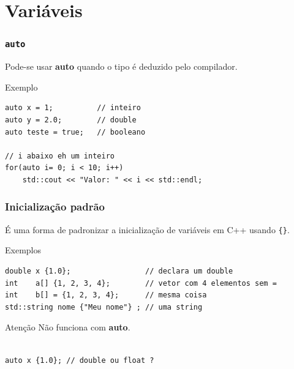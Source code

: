 \documentclass[xcolor={usenames,dvipsnames},10pt,compress,aspectratio=169]{beamer}
\begin{document}
\section{Variáveis}
\begin{frame}[fragile]
  \frametitle{\texttt{auto}}
Pode-se usar \textbf{auto} quando o tipo é deduzido pelo compilador.
  \begin{block}{Exemplo}
\begin{lstlisting}
auto x = 1;          // inteiro
auto y = 2.0;        // double
auto teste = true;   // booleano

// i abaixo eh um inteiro
for(auto i= 0; i < 10; i++)
    std::cout << "Valor: " << i << std::endl;
\end{lstlisting}
  \end{block}
\end{frame}
\begin{frame}[fragile]
  \frametitle{Inicialização padrão}
É uma forma de padronizar a inicialização de variáveis em C++ usando \verb+{}+.
  \begin{block}{Exemplos}
\begin{lstlisting}
double x {1.0};                 // declara um double
int    a[] {1, 2, 3, 4};        // vetor com 4 elementos sem = 
int    b[] = {1, 2, 3, 4};      // mesma coisa
std::string nome {"Meu nome"} ; // uma string
\end{lstlisting}
  \end{block}
\begin{alertblock}{Atenção}
Não funciona com \textbf{auto}.
\begin{lstlisting}

auto x {1.0}; // double ou float ?
\end{lstlisting}
\end{alertblock}
\end{frame}
\end{document}
